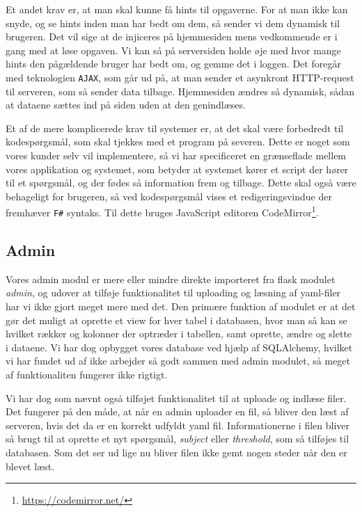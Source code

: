 \documentclass[11pt, a4paper]{article}
\begin{document}
Et andet krav er, at man skal kunne få hints til opgaverne. For at man ikke kan snyde, og se hints inden man har bedt om dem, så sender vi dem dynamisk til brugeren. Det vil sige at de injiceres på hjemmesiden mens vedkommende er i gang med at løse opgaven. Vi kan så på serversiden holde øje med hvor mange hints den pågældende bruger har bedt om, og gemme det i loggen. Det foregår med teknologien \verb!AJAX!, som går ud på, at man sender et asynkront HTTP-request til serveren, som så sender data tilbage. Hjemmesiden ændres så dynamisk, sådan at dataene sættes ind på siden uden at den genindlæses.

Et af de mere komplicerede krav til systemer er, at det skal være forbedredt til kodespørgsmål, som skal tjekkes med et program på severen. Dette er noget som vores kunder selv vil implementere, så vi har specificeret en grænseflade mellem vores applikation og systemet, som betyder at systemet kører et script der hører til et spørgsmål, og der fødes så information frem og tilbage. Dette skal også være behageligt for brugeren, så ved kodespørgsmål vises et redigeringsvindue der fremhæver \verb!F#! syntaks. Til dette bruges JavaScript editoren CodeMirror\footnote{\url{https://codemirror.net/}}.

\subsection{Admin}
\label{sub:admin}
Vores admin modul er mere eller mindre direkte importeret fra flask modulet \emph{admin}, og udover at tilføje funktionalitet til uploading og læsning af yaml-filer har vi ikke gjort meget mere med det. Den primære funktion af modulet er at det gør det muligt at oprette et view for hver tabel i databasen, hvor man så kan se hvilket rækker og kolonner der optræder i tabellen, samt oprette, ændre og slette i dataene. Vi har dog opbygget vores database ved hjælp af SQLAlchemy, hvilket vi har fundet ud af ikke arbejder så godt sammen med admin modulet, så meget af funktionaliten fungerer ikke rigtigt. 

Vi har dog som nævnt også tilføjet funktionalitet til at uploade og indlæse filer. Det fungerer på den måde, at når en admin uploader en fil, så bliver den læst af serveren, hvis det da er en korrekt udfyldt yaml fil. Informationerne i filen bliver så brugt til at oprette et nyt spørgsmål, \emph{subject} eller \emph{threshold}, som så tilføjes til databasen. Som det ser ud lige nu bliver filen ikke gemt nogen steder når den er blevet læst.
\end{document}
